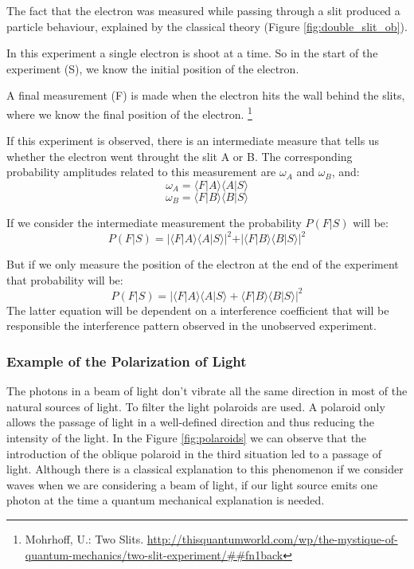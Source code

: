 The fact that the electron was measured while passing through a slit produced a particle behaviour, explained by the classical theory (Figure \ref{fig:double_slit_ob}). 


In this experiment a single electron is shoot at a time. So in the start of the experiment (S), we know the initial position of the electron.

A final measurement (F) is made when the electron hits the wall behind the slits, where we know the final position of the electron.
\footnote{Mohrhoff, U.: Two Slits. \url{http://thisquantumworld.com/wp/the-mystique-of-quantum-mechanics/two-slit-experiment/##fn1back}}

If this experiment is observed, there is an intermediate measure that tells us whether the electron went throught the slit A or B. The corresponding probability amplitudes related to this measurement are $\omega_{A}$ and $\omega_{B}$, and:
\begin{equation}
\omega_{A} = \langle F \vert A\rangle \langle A \vert S\rangle
\end{equation}
\begin{equation}
\omega_{B} = \langle F \vert B\rangle \langle B \vert S\rangle
\end{equation}

If we consider the intermediate measurement the probability $P(F\vert S)$ will be:
\begin{equation}
P(F\vert S) = 
\vert \langle F \vert A\rangle \langle A \vert S\rangle \vert^{2}
+
\vert \langle F \vert B\rangle \langle B \vert S\rangle \vert^{2}
\end{equation}

But if we only measure the position of the electron at the end of the experiment that probability will be:
\begin{equation}
P(F\vert S) = 
\vert \langle F \vert A\rangle \langle A \vert S\rangle 
+
 \langle F \vert B\rangle \langle B \vert S\rangle \vert^{2}
\end{equation}
The latter equation will be dependent on a interference coefficient that will be responsible the interference pattern observed in the unobserved experiment.



\subsubsection{Example of the Polarization of Light}
The photons in a beam of light don't vibrate all the same direction in most of the natural sources of light. To filter the light polaroids are used. A polaroid only allows the passage of light in a well-defined direction and thus reducing the intensity of the light. In the Figure \ref{fig:polaroids} we can observe that the introduction of the oblique polaroid in the third situation led to a passage of light. Although there is a classical explanation to this phenomenon if we consider waves when we are considering a beam of light, if our light source emits one photon at the time a quantum mechanical explanation is needed\cite{Rieffel2011}.

